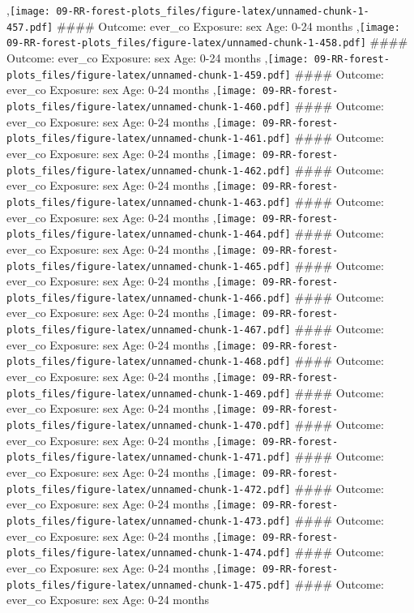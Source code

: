 \documentclass[
  9pt,
]{book}
\begin{document}
,\texttt{[image: 09-RR-forest-plots\_files/figure-latex/unnamed-chunk-1-457.pdf]}
\#\#\#\# Outcome: ever\_co Exposure: sex Age: 0-24 months
,\texttt{[image: 09-RR-forest-plots\_files/figure-latex/unnamed-chunk-1-458.pdf]}
\#\#\#\# Outcome: ever\_co Exposure: sex Age: 0-24 months
,\texttt{[image: 09-RR-forest-plots\_files/figure-latex/unnamed-chunk-1-459.pdf]}
\#\#\#\# Outcome: ever\_co Exposure: sex Age: 0-24 months
,\texttt{[image: 09-RR-forest-plots\_files/figure-latex/unnamed-chunk-1-460.pdf]}
\#\#\#\# Outcome: ever\_co Exposure: sex Age: 0-24 months
,\texttt{[image: 09-RR-forest-plots\_files/figure-latex/unnamed-chunk-1-461.pdf]}
\#\#\#\# Outcome: ever\_co Exposure: sex Age: 0-24 months
,\texttt{[image: 09-RR-forest-plots\_files/figure-latex/unnamed-chunk-1-462.pdf]}
\#\#\#\# Outcome: ever\_co Exposure: sex Age: 0-24 months
,\texttt{[image: 09-RR-forest-plots\_files/figure-latex/unnamed-chunk-1-463.pdf]}
\#\#\#\# Outcome: ever\_co Exposure: sex Age: 0-24 months
,\texttt{[image: 09-RR-forest-plots\_files/figure-latex/unnamed-chunk-1-464.pdf]}
\#\#\#\# Outcome: ever\_co Exposure: sex Age: 0-24 months
,\texttt{[image: 09-RR-forest-plots\_files/figure-latex/unnamed-chunk-1-465.pdf]}
\#\#\#\# Outcome: ever\_co Exposure: sex Age: 0-24 months
,\texttt{[image: 09-RR-forest-plots\_files/figure-latex/unnamed-chunk-1-466.pdf]}
\#\#\#\# Outcome: ever\_co Exposure: sex Age: 0-24 months
,\texttt{[image: 09-RR-forest-plots\_files/figure-latex/unnamed-chunk-1-467.pdf]}
\#\#\#\# Outcome: ever\_co Exposure: sex Age: 0-24 months
,\texttt{[image: 09-RR-forest-plots\_files/figure-latex/unnamed-chunk-1-468.pdf]}
\#\#\#\# Outcome: ever\_co Exposure: sex Age: 0-24 months
,\texttt{[image: 09-RR-forest-plots\_files/figure-latex/unnamed-chunk-1-469.pdf]}
\#\#\#\# Outcome: ever\_co Exposure: sex Age: 0-24 months
,\texttt{[image: 09-RR-forest-plots\_files/figure-latex/unnamed-chunk-1-470.pdf]}
\#\#\#\# Outcome: ever\_co Exposure: sex Age: 0-24 months
,\texttt{[image: 09-RR-forest-plots\_files/figure-latex/unnamed-chunk-1-471.pdf]}
\#\#\#\# Outcome: ever\_co Exposure: sex Age: 0-24 months
,\texttt{[image: 09-RR-forest-plots\_files/figure-latex/unnamed-chunk-1-472.pdf]}
\#\#\#\# Outcome: ever\_co Exposure: sex Age: 0-24 months
,\texttt{[image: 09-RR-forest-plots\_files/figure-latex/unnamed-chunk-1-473.pdf]}
\#\#\#\# Outcome: ever\_co Exposure: sex Age: 0-24 months
,\texttt{[image: 09-RR-forest-plots\_files/figure-latex/unnamed-chunk-1-474.pdf]}
\#\#\#\# Outcome: ever\_co Exposure: sex Age: 0-24 months
,\texttt{[image: 09-RR-forest-plots\_files/figure-latex/unnamed-chunk-1-475.pdf]}
\#\#\#\# Outcome: ever\_co Exposure: sex Age: 0-24 months
\end{document}
